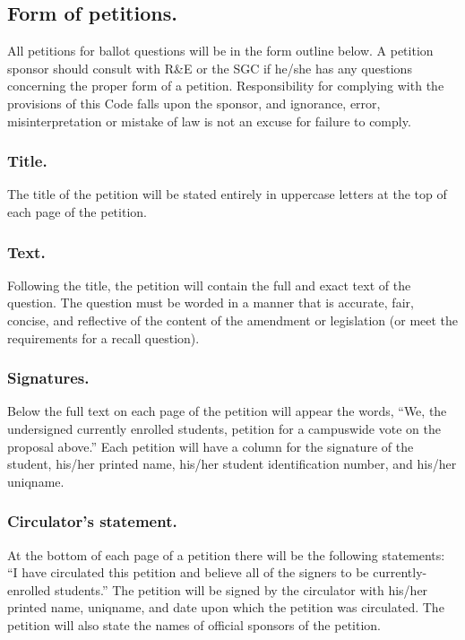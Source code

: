 \subsection{Form of petitions.}
All petitions for ballot questions will be in the form outline below.  A petition sponsor should consult with R\&E or the SGC if he/she has any questions concerning the proper form of a petition.  Responsibility for complying with the provisions of this Code falls upon the sponsor, and ignorance, error, misinterpretation or mistake of law is not an excuse for failure to comply.

\subsubsection{Title.}
The title of the petition will be stated entirely in uppercase letters at the top of each page of the petition.

\subsubsection{Text.}
Following the title, the petition will contain the full and exact text of the question. The question must be worded in a manner that is accurate, fair, concise, and reflective of the content of the amendment or legislation (or meet the requirements for a recall question).

\subsubsection{Signatures.}
Below the full text on each page of the petition will appear the words, ``We, the undersigned currently enrolled students, petition for a campuswide vote on the proposal above.''  Each petition will have a column for the signature of the student, his/her printed name, his/her student identification number, and his/her uniqname.

\subsubsection{Circulator's statement.}
At the bottom of each page of a petition there will be the following statements: ``I have circulated this petition and believe all of the signers to be currently-enrolled students.''  The petition will be signed by the circulator with his/her printed name, uniqname, and date upon which the petition was circulated.  The petition will also state the names of official sponsors of the petition.

